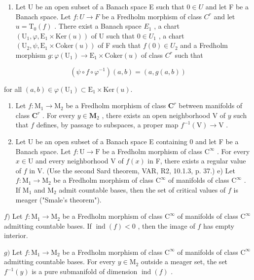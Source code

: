 \begin{enumerate}
\def\labelenumi{\alph{enumi})}
\setcounter{enumi}{1}
\tightlist
\item
  Let U be an open subset of a Banach space E such that \(0 \in U\) and let F be a Banach space. Let \(f: U \to F\) be a Fredholm morphism of class \(C^{r}\) and let \(u = \mathrm{T}_{0}(f)\) . There exist a Banach space \(E_{1}\) , a chart \((\mathrm{U}_{1}, \varphi, \mathrm{E}_{1} \times \mathrm{Ker}(u))\) of U such that \(0 \in U_{1}\) , a chart \((\mathrm{U}_{2}, \psi, \mathrm{E}_{1} \times \mathrm{Coker}(u))\) of F such that \(f(0) \in U_{2}\) and a Fredholm morphism \(g: \varphi(\mathrm{U}_{1}) \to \mathrm{E}_{1} \times \mathrm{Coker}(u)\) of class \(C^{r}\) such that
\end{enumerate}

\[
(\psi \circ f \circ \varphi^ {- 1}) (a, b) = (a, g (a, b))
\]

for all \((a,b)\in \varphi (\mathrm{U}_1)\subset \mathrm{E}_1\times \mathrm{Ker}(u).\)

\begin{enumerate}
\def\labelenumi{\alph{enumi})}
\setcounter{enumi}{2}
\item
  Let \(f \colon \mathrm{M}_1 \to \mathrm{M}_2\) be a Fredholm morphism of class \(\mathbf{C}^r\) between manifolds of class \(\mathbf{C}^r\) . For every \(y \in \mathbf{M}_2\) , there exists an open neighborhood \(\mathrm{V}\) of \(y\) such that \(f\) defines, by passage to subspaces, a proper map \(f^{-1}(\mathrm{V}) \to \mathrm{V}\) .
\item
  Let U be an open subset of a Banach space E containing 0 and let F be a Banach space. Let \(f \colon \mathrm{U} \to \mathrm{F}\) be a Fredholm morphism of class \(\mathrm{C}^{\infty}\) . For every \(x \in \mathrm{U}\) and every neighborhood V of \(f(x)\) in F, there exists a regular value of \(f\) in V. (Use the second Sard theorem, VAR, R2, 10.1.3, p. 37.) e) Let \(f \colon \mathrm{M}_1 \to \mathrm{M}_2\) be a Fredholm morphism of class \(\mathrm{C}^{\infty}\) of manifolds of class \(\mathrm{C}^{\infty}\) . If \(\mathrm{M}_1\) and \(\mathrm{M}_2\) admit countable bases, then the set of critical values of \(f\) is meager ("Smale's theorem").
\end{enumerate}

\(f)\) Let \(f\colon \mathrm{M}_1\to \mathrm{M}_2\) be a Fredholm morphism of class \(\mathrm{C}^{\infty}\) of manifolds of class \(\mathrm{C}^{\infty}\) admitting countable bases. If \(\operatorname {ind}(f) < 0\) , then the image of \(f\) has empty interior.

\(g)\) Let \(f\colon \mathrm{M}_1\to \mathrm{M}_2\) be a Fredholm morphism of class \(\mathrm{C}^{\infty}\) of manifolds of class \(\mathrm{C}^{\infty}\) admitting countable bases. For every \(y\in \mathrm{M}_2\) outside a meager set, the set \(f^{-1}(y)\) is a pure submanifold of dimension \(\operatorname {ind}(f)\) .
\relax{}
